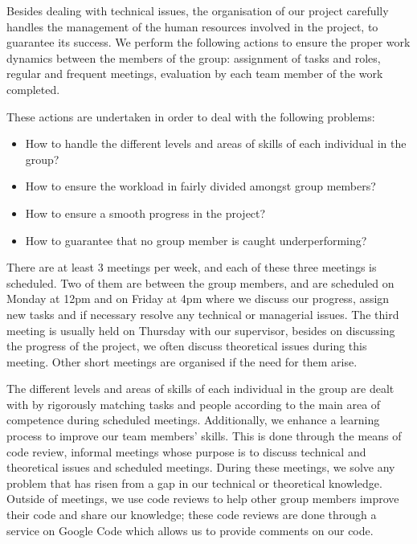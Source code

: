 Besides dealing with technical issues, the organisation of our project carefully handles the management of the human resources involved in the project, to guarantee its success. We perform the following actions to ensure the proper work dynamics between the members of the group: assignment of tasks and roles, regular and frequent meetings, evaluation by each team member of the work completed.

These actions are undertaken in order to deal with the following problems:

\begin{itemize}
\item How to handle the different levels and areas of skills of each individual in the group?
\item How to ensure the workload in fairly divided amongst group members?
\item How to ensure a smooth progress in the project?
\item How to guarantee that no group member is caught underperforming?
\end{itemize}

There are at least 3 meetings per week, and each of these three meetings is scheduled. Two of them are between the group members, and are scheduled on Monday at 12pm and on Friday at 4pm where we discuss our progress,  assign new tasks and if necessary resolve any technical or managerial issues. The third meeting is usually held on Thursday with our supervisor, besides on discussing the progress of the project, we often discuss theoretical issues during this meeting. Other short meetings are organised if the need for them arise.

The different levels and areas of skills of each individual in the group are dealt with by rigorously matching tasks and people according to the main area of competence during scheduled meetings. Additionally, we enhance a learning process to improve our team members' skills. This is done through the means of code review, informal meetings whose purpose is to discuss technical and theoretical issues and scheduled meetings. During these meetings, we solve any problem that has risen from a gap in our technical or theoretical knowledge. Outside of meetings, we use code reviews to help other group members improve their code and share our knowledge; these code reviews are done through a service on Google Code which allows us to provide comments on our code.

